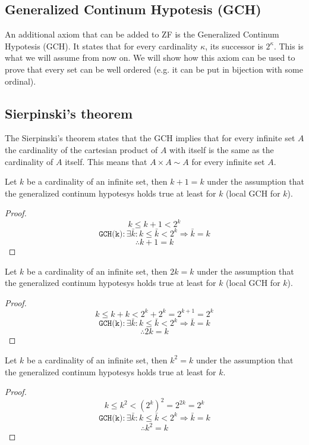 \subsection{Generalized Continum Hypotesis (GCH)}
An additional axiom that can be added to ZF is the Generalized Continum Hypotesis (GCH). It 
states that for every cardinality $\kappa$, its successor is $2^{\kappa}$. This is what we 
will assume from now on. We will show how this axiom can be used to prove that every set 
can be well ordered (e.g. it can be put in bijection with some ordinal).

\subsection{Sierpinski's theorem}
The Sierpinski's theorem states that the GCH implies that for every infinite set $A$ the cardinality of the cartesian product of $A$ 
with itself is the same as the cardinality of $A$ itself. This means that $A \times A \sim A$ for every infinite set $A$.

\begin{lemma}
    Let $k$ be a cardinality of an infinite set, then $k + 1 = k$ under the assumption that the generalized continum 
    hypotesys holds true at least for $k$ (local GCH for $k$).
\end{lemma}
\begin{proof}
    $$ k \leq k + 1 < 2^k                                                  $$
    $$ \texttt{GCH(k)}: \exists \bar{k} : k \leq \bar{k} < 2^k \Rightarrow \bar{k} = k $$
    $$ \therefore k + 1 = k                                                $$
\end{proof}

\begin{lemma}
    Let $k$ be a cardinality of an infinite set, then $2k = k$ under the assumption that the generalized continum 
    hypotesys holds true at least for $k$ (local GCH for $k$).
\end{lemma}
\begin{proof}
    $$ k \leq k + k < 2^k + 2^k = 2^{k+1} = 2^k                                        $$
    $$ \texttt{GCH(k)}: \exists \bar{k} : k \leq \bar{k} < 2^k \Rightarrow \bar{k} = k $$
    $$ \therefore 2k = k                                                               $$
\end{proof}

\begin{theorem}
    Let $k$ be a cardinality of an infinite set, then $k^2 = k$ under the assumption that the generalized continum 
    hypotesys holds true at least for $k$.
\end{theorem}
\begin{proof}
    $$ k \leq k^2 < (2^k)^2 = 2^{2k} = 2^k                                             $$
    $$ \texttt{GCH(k)}: \exists \bar{k} : k \leq \bar{k} < 2^k \Rightarrow \bar{k} = k $$
    $$ \therefore k^2 = k                                                              $$
\end{proof}

